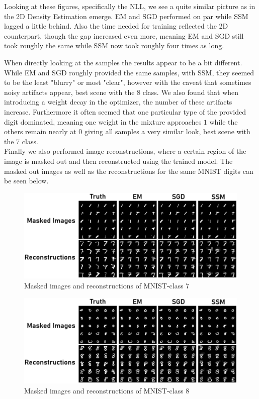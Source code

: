 Looking at these figures, specifically the NLL, we see a quite similar picture as in the 2D Density Estimation emerge. 
EM and SGD performed on par while SSM lagged a little behind. 
Also the time needed for training reflected the 2D counterpart, though the gap increased even more, meaning EM and SGD still took roughly the same while SSM now took roughly four times as long. 

When directly looking at the samples the results appear to be a bit different. While EM and SGD roughly provided the same samples, with SSM, they seemed to be the least "blurry" or most "clear", however with the caveat
that sometimes noisy artifacts appear, best scene with the 8 class. We also found that when introducing 
a weight decay in the optimizer, the number of these artifacts increase. Furthermore it often seemed that
one particular type of the provided digit dominated, meaning one weight in the mixture approaches $1$ while 
the others remain nearly at $0$ giving all samples a very similar look, best scene with the 7 class. \\

Finally we also performed image reconstructions, where a certain region of the image is masked out and then reconstructed using the trained model.
The masked out images as well as the reconstructions for the same MNIST digits can be seen below.

\begin{figure}[H]
    \centering
    \includegraphics[width=\textwidth]{figures/einsum/mnist/reconstructions_7.png}
    \caption{Masked images and reconstructions of MNIST-class 7}
\end{figure}

\begin{figure}[H]
    \centering
    \includegraphics[width=\textwidth]{figures/einsum/mnist/reconstructions_8.png}
    \caption{Masked images and reconstructions of MNIST-class 8}
\end{figure}

